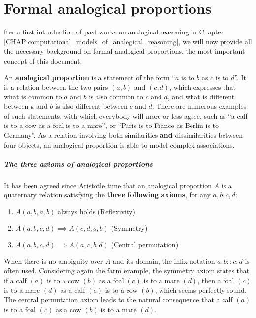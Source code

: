\chapter{Formal analogical proportions}
\label{CHAP:formal_analogical_proportions}
\localtableofcontents*
\vspace*{\baselineskip}

fter a first introduction of past works on analogical reasoning in
Chapter \ref{CHAP:computational_models_of_analogical_reasoning}, we will now
provide all the necessary background on formal analogical proportions, the most
important concept of this document.

An \textbf{analogical proportion} is a statement of the form ``$a$ is to $b$ as
$c$ is to $d$''. It is a relation between the two pairs $(a,b)$ and $(c,d)$,
which expresses that what is common to $a$ and $b$ is also common to $c$ and
$d$, and what is different between $a$ and $b$ is also different between $c$
and $d$. There are numerous examples of such statements, with which everybody
will more or less agree, such as  ``a calf is to a cow as a foal is to a
mare'', or ``Paris is to France as Berlin is to Germany''.  As a relation
involving both similarities \textbf{and} dissimilarities between four objects,
an analogical proportion is able to model complex associations.

\paragraph{The three axioms of analogical proportions\\}

It has been agreed since Aristotle time that an analogical proportion $A$ is a
quaternary relation satisfying the \textbf{three following axioms}, for any $a,
b, c, d$:

\begin{enumerate}
\item $A(a,b,a,b)$ always holds (Reflexivity)
\item $A(a,b,c,d) \implies A(c,d,a,b)$ (Symmetry)
\item $A(a,b,c,d) \implies A(a,c,b,d)$ (Central permutation)
\end{enumerate}

When there is no ambiguity over $A$ and its domain, the infix notation
$a:b::c:d$ is often used. Considering again the farm example, the symmetry
axiom states that if a calf $(a)$ is to a cow $(b)$ as a foal $(c)$ is to a
mare $(d)$, then a foal $(c)$ is to a mare $(d)$ as a calf $(a)$ is to a cow
$(b)$, which seems perfectly sound. The central permutation axiom leads to the
natural consequence that a calf $(a)$ is to a foal $(c)$ as a cow $(b)$ is to a
mare $(d)$.

